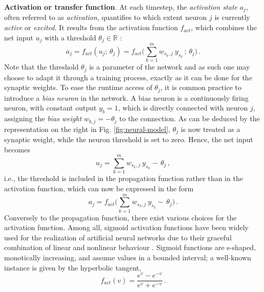 \documentclass{elsarticle}
\numberwithin{equation}{section}
\theoremstyle{theorem}
\theoremstyle{definition}
\theoremstyle{remark}
\theoremstyle{proposition}
\numberwithin{figure}{section}
\begin{document}
		\noindent \textbf{Activation or transfer function}. At each timestep, the \emph{activation state} $a_j$, often referred to as \emph{activation}, quantifies to which extent neuron $j$ is currently \emph{active} or \emph{excited}. It results from the activation function $f_{act}$, which combines the net input $u_j$ with a threshold $\theta_j \in \mathbb{R}$ \cite{Kri07}: 
		\begin{equation*}
			\label{eq:activation-function}
			a_j = f_{act}(u_j; \, \theta_j) = f_{act} \big( \sum_{k = 1}^m w_{s_k,j} ~ y_{s_k} \, ; \, \theta_j \big) \, .
		\end{equation*}
		Note that the threshold $\theta_j$ is a parameter of the network and as such one may choose to adapt it through a training process, exactly as it can be done for the synaptic weights. To ease the runtime access of $\theta_j$, it is common practice to introduce a \emph{bias neuron} in the network. A bias neuron is a continuously firing neuron, with constant output $y_{b} = 1$, which is directly connected with neuron $j$, assigning the \emph{bias weight} $w_{b,j} = - \theta_j$ to the connection. As can be deduced by the representation on the right in Fig. \ref{fig:neural-model}, $\theta_j$ is now treated as a synaptic weight, while the neuron threshold is set to zero. Hence, the net input becomes
		\begin{equation*}
			\label{eq:net-input}
			u_j = \sum_{k = 1}^m w_{s_k,j} ~ y_{s_k} - \, \theta_j \, ,
		\end{equation*}
		i.e., the threshold is included in the propagation function rather than in the activation function, which can now be expressed in the form
		\begin{equation*}
			a_j = f_{act} \big( \sum_{k = 1}^m w_{s_k,j} ~ y_{s_k} - \, \theta_j \big) \, .
		\end{equation*}		
		Conversely to the propagation function, there exist various choices for the activation function. Among all, sigmoid activation functions have been widely used for the realization of artificial neural networks due to their graceful combination of linear and nonlinear behaviour \cite{Hay05}. Sigmoid functions are s-shaped, monotically increasing, and assume values in a bounded interval; a well-known instance is given by the hyperbolic tangent,
		\begin{equation*}
			\label{eq:hyperbolic-tangent}
			f_{act}(v) = \dfrac{e^{v} - e^{-v}}{e^v + e^{-v}} \, .
		\end{equation*}
		
		
\end{document}
